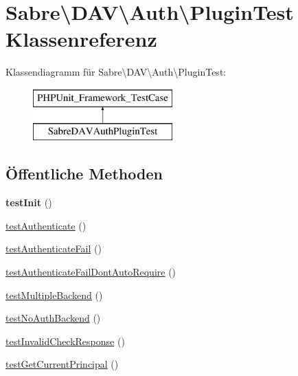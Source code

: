 \hypertarget{class_sabre_1_1_d_a_v_1_1_auth_1_1_plugin_test}{}\section{Sabre\textbackslash{}D\+AV\textbackslash{}Auth\textbackslash{}Plugin\+Test Klassenreferenz}
\label{class_sabre_1_1_d_a_v_1_1_auth_1_1_plugin_test}
Klassendiagramm für Sabre\textbackslash{}D\+AV\textbackslash{}Auth\textbackslash{}Plugin\+Test\+:\begin{figure}[H]
\begin{center}
\leavevmode
\includegraphics[height=2.000000cm]{class_sabre_1_1_d_a_v_1_1_auth_1_1_plugin_test}
\end{center}
\end{figure}
\subsection*{Öffentliche Methoden}
\begin{DoxyCompactItemize}
\item 
\mbox{\label{class_sabre_1_1_d_a_v_1_1_auth_1_1_plugin_test_af27a8002959d73162bec8ecac61618e9}} 
{\bfseries test\+Init} ()
\item 
\mbox{\hyperlink{class_sabre_1_1_d_a_v_1_1_auth_1_1_plugin_test_a3338db8faeaead3eb57d9da71975c688}{test\+Authenticate}} ()
\item 
\mbox{\hyperlink{class_sabre_1_1_d_a_v_1_1_auth_1_1_plugin_test_a2e75a7606daec7cae999531de05e7a5b}{test\+Authenticate\+Fail}} ()
\item 
\mbox{\hyperlink{class_sabre_1_1_d_a_v_1_1_auth_1_1_plugin_test_ae4bb66e5f3efd06df49414f1e4714a8e}{test\+Authenticate\+Fail\+Dont\+Auto\+Require}} ()
\item 
\mbox{\hyperlink{class_sabre_1_1_d_a_v_1_1_auth_1_1_plugin_test_aa95f77ae0d5488d287de45532557b24c}{test\+Multiple\+Backend}} ()
\item 
\mbox{\hyperlink{class_sabre_1_1_d_a_v_1_1_auth_1_1_plugin_test_ac37737a8b6d20d032506884cb7914024}{test\+No\+Auth\+Backend}} ()
\item 
\mbox{\hyperlink{class_sabre_1_1_d_a_v_1_1_auth_1_1_plugin_test_aac944d97cedaaea083ec067914aa9aa3}{test\+Invalid\+Check\+Response}} ()
\item 
\mbox{\hyperlink{class_sabre_1_1_d_a_v_1_1_auth_1_1_plugin_test_acf602435dd43ef533dc1049e5bb3e34f}{test\+Get\+Current\+Principal}} ()
\end{DoxyCompactItemize}


